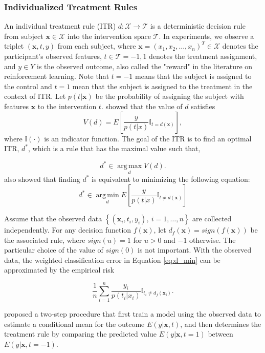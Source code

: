 \documentclass{article}
\begin{document}
\subsubsection{Individualized Treatment Rules}
An individual treatment rule (ITR) $d: \mathcal{X} \rightarrow \mathcal{T}$ is a deterministic decision
rule from subject $\mathbf{x} \in \mathcal{X}$ into the intervention space $\mathcal{T}$. In experiments, we observe a triplet $(\mathbf{x}, t, y)$ from each
subject, where $\mathbf{x}=(x_1, x_2, \ldots, x_n)^T \in
\mathcal{X}$ denotes the participant's observed features, $t \in \mathcal{T}
= {-1,1}$ denotes the treatment assignment, and $y \in Y$ is the
observed outcome, also called the "reward" in the literature on
reinforcement learning. Note that $t=-1$ means that the subject is
assigned to the control and $t=1$ mean that the subject is assigned to
the treatment in the
context of ITR. Let $p(t|\mathbf{x})$ be the probability of assigning the subject
with features $\mathbf{x}$ to the intervention $t$. \cite{Qian2011-vz}
showed that the
value of $d$ satisfies
$$V(d) = E \left [ \frac{y}{p(t|x)}\mathbb{I}_{t=d(\mathbf{x})}\right
],$$
where $\mathbb{I}(\cdot)$ is an indicator function. The goal of the
ITR is to find an optimal ITR, $d^{*}$, which is a rule that has the maximal value such
that,

$$d^{*} \in \operatorname*{arg\,max}_d V(d).$$
\cite{Qian2011-vz} also showed that finding $d^{*}$ is equivalent to minimizing the following equation:
\begin{equation} \label{eq:d_min}
d^{*} \in \operatorname*{arg\,min}_d E \left [
  \frac{y}{p(t|x)}\mathbb{I}_{t \neq d(\mathbf{x})}\right
]
\end{equation}

Assume that the observed data $\left \{
  (\mathbf{x}_i,t_i,y_i),~i=1,\ldots , n \right \}$ are collected
independently. For any decision function $f(\mathbf{x})$, let
$d_f(\mathbf{x}) = sign(f(\mathbf{x}))$ be the associated rule, where
$sign(u) = 1$ for $u > 0$ and $-1$ otherwise. The particular choice of
the value of $sign(0)$ is not important. With the observed data, the
weighted classification error in Equation \ref{eq:d_min} can be approximated by
the empirical risk

\begin{equation} \label{eq:d_empirical_min}
  \frac{1}{n}\sum_{i=1}^{n}\frac{y_i}{p(t_i|x_i)}\mathbb{I}_{t_i \neq
    d_f(\mathbf{x_i})} .
\end{equation}

\cite{Qian2011-vz} proposed a two-step procedure that first train a
model using the observed data to estimate
a conditional mean for the outcome $E(y|\mathbf{x},t)$, and then determines the treatment
rule by comparing the predicted value $E(y|\mathbf{x},t=1)$ between $E(y|\mathbf{x},t=-1)$.
\end{document}

